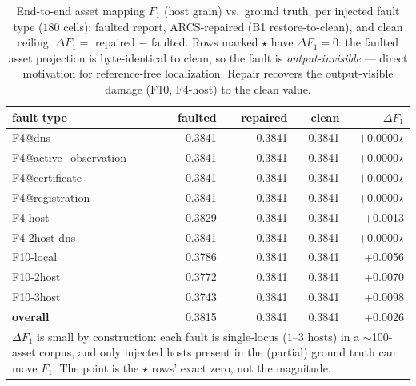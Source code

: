 \begin{table}[t]\centering\small
\caption{End-to-end asset mapping $F_1$ (host grain) vs.\ ground truth, per injected fault type ($180$ cells): faulted report, ARCS-repaired (B1 restore-to-clean), and clean ceiling. $\Delta F_1 = $ repaired $-$ faulted. Rows marked $\star$ have $\Delta F_1 = 0$: the faulted asset projection is byte-identical to clean, so the fault is \emph{output-invisible} --- direct motivation for reference-free localization. Repair recovers the output-visible damage (F10, F4-host) to the clean value.}
\label{tab:e8}
\begin{tabular}{lrrrr}\toprule
fault type & faulted & repaired & clean & $\Delta F_1$\\\midrule
F4@dns & 0.3841 & 0.3841 & 0.3841 & +0.0000$\star$\\
F4@active\_observation & 0.3841 & 0.3841 & 0.3841 & +0.0000$\star$\\
F4@certificate & 0.3841 & 0.3841 & 0.3841 & +0.0000$\star$\\
F4@registration & 0.3841 & 0.3841 & 0.3841 & +0.0000$\star$\\
F4-host & 0.3829 & 0.3841 & 0.3841 & +0.0013\\
F4-2host-dns & 0.3841 & 0.3841 & 0.3841 & +0.0000$\star$\\
F10-local & 0.3786 & 0.3841 & 0.3841 & +0.0056\\
F10-2host & 0.3772 & 0.3841 & 0.3841 & +0.0070\\
F10-3host & 0.3743 & 0.3841 & 0.3841 & +0.0098\\
\midrule
\textbf{overall} & 0.3815 & 0.3841 & 0.3841 & +0.0026\\
\midrule
\multicolumn{5}{p{.9\linewidth}}{\footnotesize $\Delta F_1$ is small by construction: each fault is single-locus ($1$--$3$ hosts) in a $\sim$100-asset corpus, and only injected hosts present in the (partial) ground truth can move $F_1$. The point is the $\star$ rows' exact zero, not the magnitude.}\\
\bottomrule\end{tabular}\end{table}
